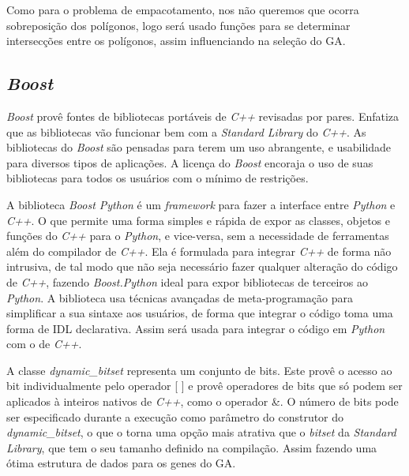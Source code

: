 Como para o problema de empacotamento, nos não queremos que ocorra sobreposição dos polígonos, logo será usado funções para se determinar intersecções entre os polígonos, assim influenciando na seleção do GA.

\subsection{\textit{Boost}}
\cite{boost:software} \textit{Boost} provê fontes de bibliotecas portáveis de \textit{C++} revisadas por pares.\newline
Enfatiza que as bibliotecas vão funcionar bem com a \textit{Standard Library} do \textit{C++}. As bibliotecas do \textit{Boost} são pensadas para terem um uso abrangente, e usabilidade para diversos tipos de aplicações. A licença do \textit{Boost} encoraja o uso de suas bibliotecas para todos os usuários com o mínimo de restrições.

\cite{boost:Python} A biblioteca \textit{Boost Python} é um \textit{framework} para fazer a interface entre \textit{Python} e \textit{C++}. O que permite uma forma simples e rápida de expor as classes, objetos e funções do \textit{C++} para o \textit{Python}, e vice-versa, sem a necessidade de ferramentas além do compilador de \textit{C++}. Ela é formulada para integrar \textit{C++} de forma não intrusiva, de tal modo que não seja necessário fazer qualquer alteração do código de \textit{C++}, fazendo \textit{Boost.Python} ideal para expor bibliotecas de terceiros ao \textit{Python}. A biblioteca usa técnicas avançadas de meta-programação para simplificar a sua sintaxe aos usuários, de forma que integrar o código toma uma forma de IDL declarativa.\newline
Assim será usada para integrar o código em \textit{Python} com o de \textit{C++}.

\cite{boost:dynamic_bitset}A classe \textit{dynamic\_bitset} representa um conjunto de bits. Este provê o acesso ao bit individualmente pelo operador [ ] e provê operadores de bits que só podem ser aplicados à inteiros nativos de \textit{C++}, como o operador \&. O número de bits pode ser especificado durante a execução como parâmetro do construtor do \textit{dynamic\_bitset}, o que o torna uma opção mais atrativa que o \textit{bitset} da \textit{Standard Library}, que tem o seu tamanho definido na compilação. Assim fazendo uma ótima estrutura de dados para os genes do GA.


